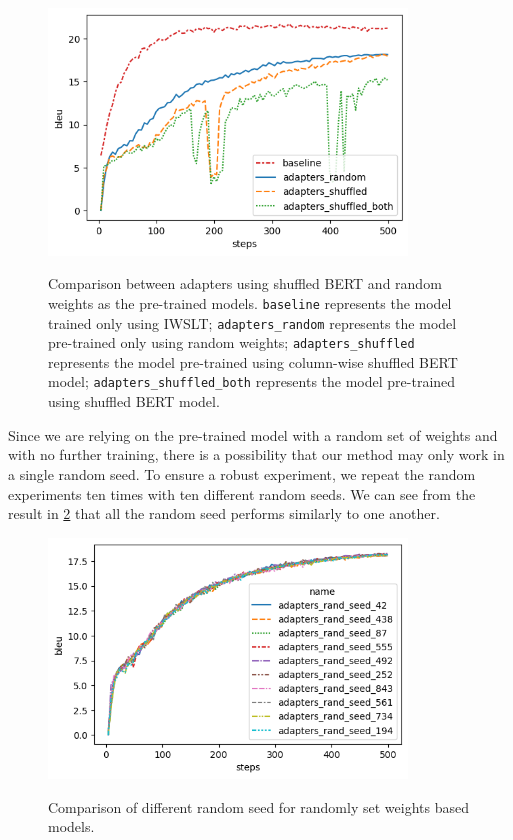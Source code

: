\begin{figure}[h]
    {\includegraphics[width=0.85\textwidth]{img/randomshuffled.png}}
    \centering
    \caption[Comparison between adapters using shuffled BERT and random weights as the pre-trained models.]{Comparison between adapters using shuffled BERT and random weights as the pre-trained models. \texttt{baseline} represents the model trained only using IWSLT; \texttt{adapters\_random} represents the model pre-trained only using random weights; \texttt{adapters\_shuffled} represents the model pre-trained using column-wise shuffled BERT model; \texttt{adapters\_shuffled\_both} represents the model pre-trained using shuffled BERT model.}
    \label{img:shfrndcmp}
\end{figure}

Since we are relying on the pre-trained model with a random set of weights and with no further training, there is a possibility that our method may only work in a single random seed. To ensure a robust experiment, we repeat the random experiments ten times with ten different random seeds. We can see from the result in \cref{img:rndmseed} that all the random seed performs similarly to one another.

\begin{figure}[h]
    {\includegraphics[width=0.85\textwidth]{img/adapter_random_multiseed.png}}
    \centering
    \caption{Comparison of different random seed for randomly set weights based models.}
    \label{img:rndmseed}
\end{figure}

